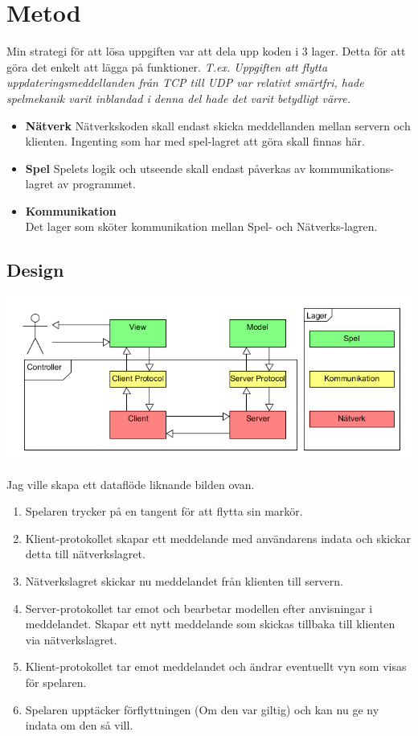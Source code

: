 \documentclass[10pt, titlepage, oneside, a4paper]{article}
\begin{document}
	\section{Metod}
	
		Min strategi för att lösa uppgiften var att dela upp koden i 3 lager. Detta för att göra det enkelt att lägga på funktioner. \textit{T.ex. Uppgiften att flytta uppdateringsmeddellanden från TCP till UDP var relativt smärtfri, hade spelmekanik varit inblandad i denna del hade det varit betydligt värre.}
		\begin{itemize}
			\item \textbf{Nätverk} Nätverkskoden skall endast skicka meddellanden mellan servern och klienten. Ingenting som har med spel-lagret att göra skall finnas här.
			\item \textbf{Spel} Spelets logik och utseende skall endast påverkas av kommunikations-lagret av programmet.
			\item \textbf{Kommunikation}\\Det lager som sköter kommunikation mellan Spel- och Nätverks-lagren. 
		\end{itemize}
		
		\subsection{Design}
			\begin{center}
				\includegraphics[scale=.5]{./documentation/images/abstract.png}
			\end{center}
			
			Jag ville skapa ett dataflöde liknande bilden ovan.
			\begin{enumerate}
				\item Spelaren trycker på en tangent för att flytta sin markör.
				\item Klient-protokollet skapar ett meddelande med användarens indata och skickar detta till nätverkslagret.
				\item Nätverkslagret skickar nu meddelandet från klienten till servern.
				\item Server-protokollet tar emot och bearbetar modellen efter anvisningar i meddelandet. Skapar ett nytt meddelande som skickas tillbaka till klienten via nätverkslagret.
				\item Klient-protokollet tar emot meddelandet och ändrar eventuellt vyn som visas för spelaren.
				\item Spelaren upptäcker förflyttningen (Om den var giltig) och kan nu ge ny indata om den så vill.
			\end{enumerate}
		
\end{document}
